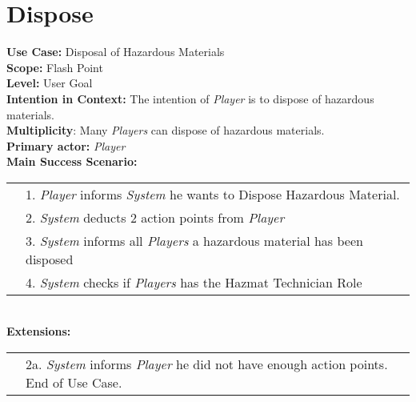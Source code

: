 \documentclass{article}
\begin{document}
	\section*{Dispose}
	\textbf{Use Case:} Disposal of Hazardous Materials\\
	\textbf{Scope:} Flash Point\\
	\textbf{Level:} User Goal\\
	\textbf{Intention in Context:} The intention of \textit{Player} is to dispose of hazardous materials.\\
	\textbf{Multiplicity}: Many \textit{Players} can dispose of hazardous materials.\\
	\textbf{Primary actor:} \textit{Player}\\
	\textbf{Main Success Scenario:}\\
	\begin{tabular}{l l}
		&1. \textit{Player} informs \textit{System} he wants to Dispose Hazardous Material.\\
		&2. \textit{System} deducts 2 action points from \textit{Player}\\
		&3. \textit{System} informs all \textit{Players} a hazardous material has been disposed\\
		&4. \textit{System} checks if \textit{Players} has the Hazmat Technician Role\\
	\end{tabular}\\
	\textbf{Extensions:}\\
	\begin{tabular}{l l}
		&2a. \textit{System} informs \textit{Player} he did not have enough action points. End of Use Case.
	\end{tabular}
\end{document}
